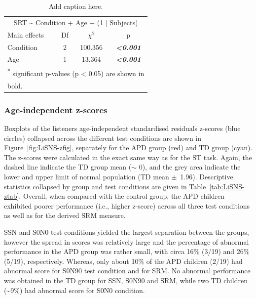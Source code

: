 \documentclass[a4paper, twoside]{templates/ociamthesis}
\begin{document}
\begin{table}

\caption{\label{tab:LiSNS-AgeLMEMTab}Add caption here.}
\centering
\begin{tabular}[t]{lcc>{}c}
\toprule
\multicolumn{4}{c}{SRT \textasciitilde{} Condition + Age + (1 | Subjects)} \\
\cmidrule(l{3pt}r{3pt}){1-4}
Main effects & Df & $\chi^{2}$ & p\\
\midrule
Condition & 2 & 100.356 & \em{\textbf{<0.001}}\\
Age & 1 & 13.364 & \em{\textbf{<0.001}}\\
\bottomrule
\multicolumn{4}{l}{\textsuperscript{*} significant p-values (p < 0.05) are shown in}\\
\multicolumn{4}{l}{bold.}\\
\end{tabular}
\end{table}

\hypertarget{age-independent-z-scores-1}{%
\subsubsection*{Age-independent z-scores}\label{age-independent-z-scores-1}}

Boxplots of the listeners age-independent standardised residuals z-scores (blue circles) collapsed across the different test conditions are shown in Figure~\ref{fig:LiSNS-zfig}, separately for the APD group (red) and TD group (cyan). The z-scores were calculated in the exact same way as for the ST task. Again, the dashed line indicate the TD group mean (\(\sim\) 0), and the grey area indicate the lower and upper limit of normal population (TD mean \(\pm\)~1.96). Descriptive statistics collapsed by group and test conditions are given in Table~\ref{tab:LiSNS-ztab}. Overall, when compared with the control group, the APD children exhibited poorer performance (i.e., higher z-score) across all three test conditions as well as for the derived SRM measure.

SSN and S0N0 test conditions yielded the largest separation between the groups, however the spread in scores was relatively large and the percentage of abnormal performance in the APD group was rather small, with circa 16\% (3/19) and 26\% (5/19), respectively. Whereas, only about 10\% of the APD children (2/19) had abnormal score for S0N90 test condition and for SRM. No abnormal performance was obtained in the TD group for SSN, S0N90 and SRM, while two TD children (\textasciitilde9\%) had abnormal score for S0N0 condition.
\end{document}
